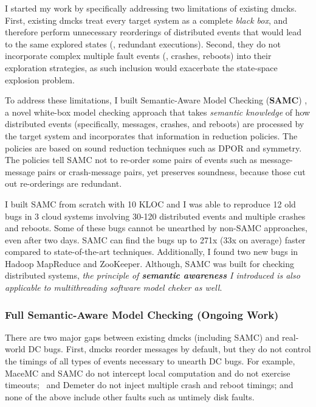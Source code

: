 \documentclass[11pt]{article}
\begin{document}
I started my work by specifically addressing two limitations of existing dmcks.
First, existing dmcks treat every target system as a complete \textit{black
box}, and therefore perform unnecessary reorderings of distributed events that
would lead to the same explored states (\ie, redundant executions). Second,
they do not incorporate complex multiple fault events (\eg, crashes, reboots)
into their exploration strategies, as such inclusion would exacerbate the
state-space explosion problem.

To address these limitations, I built Semantic-Aware Model Checking
(\textbf{SAMC}) \cite{Leesatapornwongsa+15-SamcIssta,Leesatapornwongsa+14-Samc},
a novel white-box model checking approach that takes \textit{semantic knowledge}
of how distributed events (specifically, messages, crashes, and reboots) are
processed by the target system and incorporates that information in reduction
policies. The policies are based on sound reduction techniques such as DPOR and
symmetry. The policies tell SAMC not to re-order some pairs of events such as
message-message pairs or crash-message pairs, yet preserves soundness, because
those cut out re-orderings are redundant. 

I built SAMC from scratch with 10 KLOC and I was able to reproduce 12 old bugs
in 3 cloud systems involving 30-120 distributed events and multiple crashes and
reboots. Some of these bugs cannot be unearthed by non-SAMC approaches, even
after two days. SAMC can find the bugs up to 271x (33x on average) faster
compared to state-of-the-art techniques. Additionally, I found two new bugs in
Hadoop MapReduce and ZooKeeper. Although, SAMC was built for checking
distributed systems, \textit{the principle of \textbf{semantic awareness} I
introduced is also applicable to multithreading software model cheker as well}.

\subsubsection*{Full Semantic-Aware Model Checking (Ongoing Work)} 

There are two major gaps between existing dmcks (including SAMC) and real-world
DC bugs. First, dmcks reorder messages by default, but they do not control the
timings of all types of events necessary to unearth DC bugs. For example, MaceMC
and SAMC do not intercept local computation and do not exercise timeouts;
\modist\ and Demeter do not inject multiple crash and reboot timings; and none
of the above include other faults such as untimely disk faults.
\end{document}
